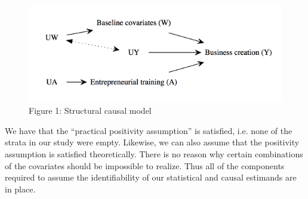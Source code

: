 \begin{figure}
  \centering
  \includegraphics{../../DAG_Uganda.png}
  \caption{Figure 1: Structural causal model\label{fig:DAG}}
\end{figure}


We have that the ``practical positivity assumption'' is satisfied, i.e. none of the strata in our study were empty. Likewise, we can also assume that the positivity assumption is satisfied theoretically. There is no reason why certain combinations of the covariates should be impossible to realize. Thus all of the components required to assume the identifiability of our statistical  and causal estimands are in place.



